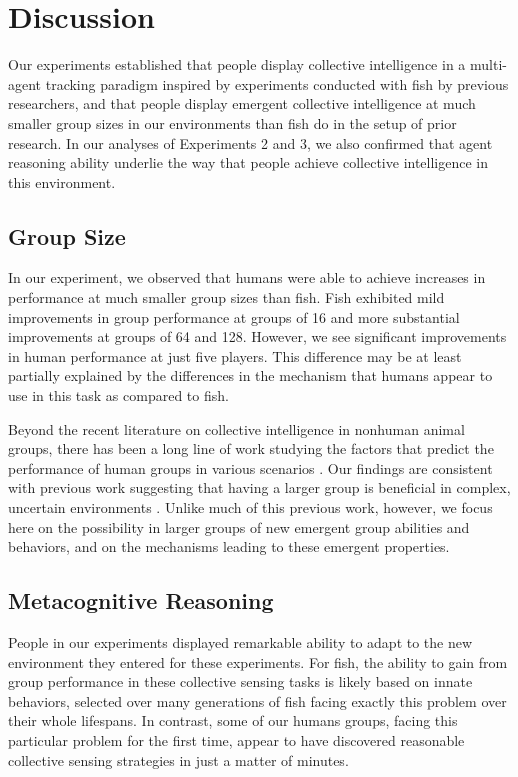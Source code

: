 \documentclass[12pt,letterpaper]{article}
\begin{document}
\section{Discussion}

Our experiments established that people display collective intelligence in a multi-agent tracking paradigm inspired by experiments conducted with fish by previous researchers, and that people display emergent collective intelligence at much smaller group sizes in our environments than fish do in the setup of prior research.  In our analyses of Experiments 2 and 3, we also confirmed that agent reasoning ability underlie the way that people achieve collective intelligence in this environment.

\subsection{Group Size}

In our experiment, we observed that humans were able to achieve
increases in performance at much smaller group sizes than fish.  Fish
exhibited mild improvements in group performance at groups of 16 and
more substantial improvements at groups of 64 and 128.  However, we
see significant improvements in human performance at just five
players.  This difference may be at least partially explained by the
differences in the mechanism that humans appear to use in this task as
compared to fish.

Beyond the recent literature on collective intelligence in nonhuman
animal groups, there has been a long line of work studying the factors
that predict the performance of human groups in various scenarios
\cite{kerr_group_2004}.  Our findings are consistent with previous
work suggesting that having a larger group is beneficial in complex,
uncertain environments \cite{stewart_meta-analytic_2006}.  Unlike much
of this previous work, however, we focus here on the possibility in
larger groups of new emergent group abilities and behaviors, and on
the mechanisms leading to these emergent properties.

\subsection{Metacognitive Reasoning}

People in our experiments displayed remarkable ability to adapt to the new environment they entered for these experiments. For fish, the ability to
gain from group performance in these collective sensing tasks is
likely based on innate behaviors, selected over many generations of
fish facing exactly this problem over their whole lifespans.  In
contrast, some of our humans groups, facing this particular problem
for the first time, appear to have discovered reasonable collective
sensing strategies in just a matter of minutes.
\end{document}
